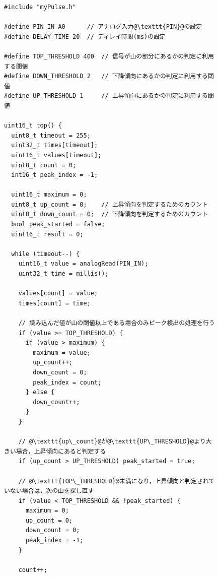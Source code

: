 \begin{figure}[H]
  \begin{lstlisting}[caption=myPulse.cpp（前半：配列バッファおよび波形探索処理）, label=b2_myPulse.cpp_part1, escapechar=\@]
#include "myPulse.h"

#define PIN_IN A0      // アナログ入力@\texttt{PIN}@の設定
#define DELAY_TIME 20  // ディレイ時間(ms)の設定

#define TOP_THRESHOLD 400  // 信号が山の部分にあるかの判定に利用する閾値
#define DOWN_THRESHOLD 2   // 下降傾向にあるかの判定に利用する閾値
#define UP_THRESHOLD 1     // 上昇傾向にあるかの判定に利用する閾値

uint16_t top() {
  uint8_t timeout = 255;
  uint32_t times[timeout];
  uint16_t values[timeout];
  uint8_t count = 0;
  int16_t peak_index = -1;

  uint16_t maximum = 0;
  uint8_t up_count = 0;    // 上昇傾向を判定するためのカウント
  uint8_t down_count = 0;  // 下降傾向を判定するためのカウント
  bool peak_started = false;
  uint16_t result = 0;

  while (timeout--) {
    uint16_t value = analogRead(PIN_IN);
    uint32_t time = millis();

    values[count] = value;
    times[count] = time;

    // 読み込んだ値が山の閾値以上である場合のみピーク検出の処理を行う
    if (value >= TOP_THRESHOLD) {
      if (value > maximum) {
        maximum = value;
        up_count++;
        down_count = 0;
        peak_index = count;
      } else {
        down_count++;
      }
    }

    // @\texttt{up\_count}@が@\texttt{UP\_THRESHOLD}@より大きい場合，上昇傾向にあると判定する
    if (up_count > UP_THRESHOLD) peak_started = true;

    // @\texttt{TOP\_THRESHOLD}@未満になり，上昇傾向と判定されていない場合は，次の山を探し直す
    if (value < TOP_THRESHOLD && !peak_started) {
      maximum = 0;
      up_count = 0;
      down_count = 0;
      peak_index = -1;
    }

    count++;
    \end{lstlisting}
\end{figure}

